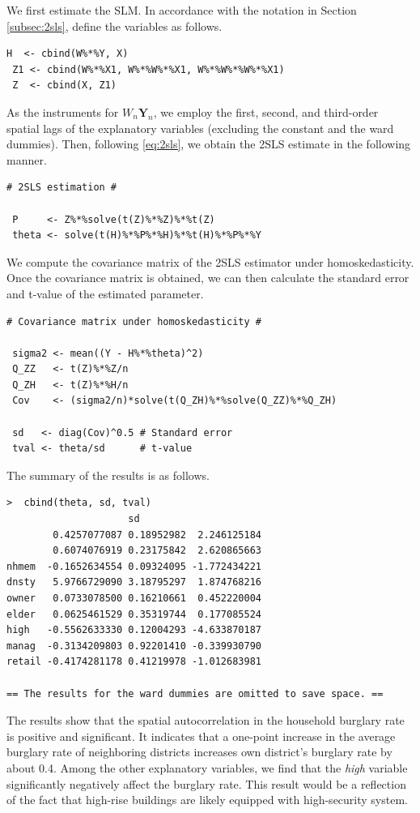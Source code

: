 \documentclass[10.5pt, A4paper, openany, uplatex]{book}
\newcommand{\mbf}{\mathbf}
\numberwithin{equation}{section}
\begin{document}
We first estimate the SLM.
In accordance with the notation in Section \ref{subsec:2sls}, define the variables as follows.
\begin{lstlisting}[basicstyle=\ttfamily\footnotesize, frame=single]
 H  <- cbind(W%*%Y, X)
 Z1 <- cbind(W%*%X1, W%*%W%*%X1, W%*%W%*%W%*%X1)
 Z  <- cbind(X, Z1)
\end{lstlisting}
As the instruments for $W_n \mbf{Y}_n$, we employ the first, second, and third-order spatial lags of the explanatory variables (excluding the constant and the ward dummies).
Then, following \eqref{eq:2sls}, we obtain the 2SLS estimate in the following manner.
\begin{lstlisting}[basicstyle=\ttfamily\footnotesize, frame=single]
# 2SLS estimation #

 P     <- Z%*%solve(t(Z)%*%Z)%*%t(Z)
 theta <- solve(t(H)%*%P%*%H)%*%t(H)%*%P%*%Y
\end{lstlisting}
We compute the covariance matrix of the 2SLS estimator under homoskedasticity.
Once the covariance matrix is obtained, we can then calculate the standard error and t-value of the estimated parameter.
\begin{lstlisting}[basicstyle=\ttfamily\footnotesize, frame=single]
# Covariance matrix under homoskedasticity #

 sigma2 <- mean((Y - H%*%theta)^2) 
 Q_ZZ   <- t(Z)%*%Z/n
 Q_ZH   <- t(Z)%*%H/n 
 Cov    <- (sigma2/n)*solve(t(Q_ZH)%*%solve(Q_ZZ)%*%Q_ZH)

 sd   <- diag(Cov)^0.5 # Standard error
 tval <- theta/sd      # t-value
\end{lstlisting}
The summary of the results is as follows. 
\begin{lstlisting}[basicstyle=\ttfamily\footnotesize, frame=single]
>  cbind(theta, sd, tval)
                     sd
        0.4257077087 0.18952982  2.246125184
        0.6074076919 0.23175842  2.620865663
nhmem  -0.1652634554 0.09324095 -1.772434221
dnsty   5.9766729090 3.18795297  1.874768216
owner   0.0733078500 0.16210661  0.452220004
elder   0.0625461529 0.35319744  0.177085524
high   -0.5562633330 0.12004293 -4.633870187
manag  -0.3134209803 0.92201410 -0.339930790
retail -0.4174281178 0.41219978 -1.012683981

== The results for the ward dummies are omitted to save space. ==
\end{lstlisting}
The results show that the spatial autocorrelation in the household burglary rate is positive and significant.
It indicates that a one-point increase in the average burglary rate of neighboring districts increases own district's burglary rate by about 0.4.
Among the other explanatory variables, we find that the \textit{high} variable significantly negatively affect the burglary rate.
This result would be a reflection of the fact that high-rise buildings are likely equipped with high-security system.
\bigskip
\end{document}
